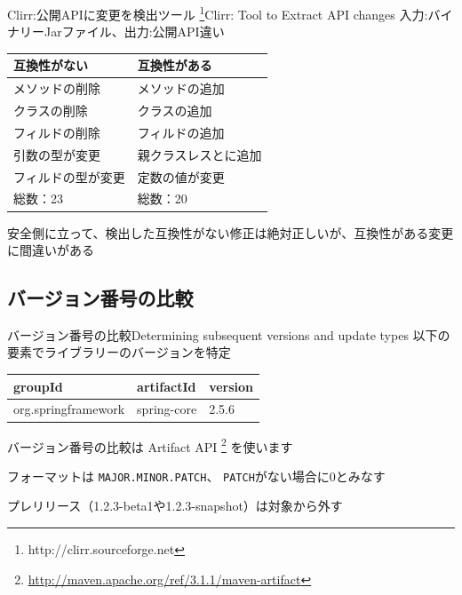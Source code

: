 \begin{frame}{Clirr:公開APIに変更を検出ツール
\footnote{http://clirr.sourceforge.net}}{Clirr: Tool to Extract API changes}
入力:バイナリーJarファイル、出力:公開API違い

\vspace{0.5em}

\begin{tabular}{l|l}
互換性がない & 互換性がある \\
\hline
メソッドの削除 & メソッドの追加 \\
クラスの削除 & クラスの追加 \\
フィルドの削除 & フィルドの追加 \\
引数の型が変更 & 親クラスレスとに追加 \\
フィルドの型が変更 & 定数の値が変更　\\
\hline
総数：23 & 総数：20
\end{tabular}

\vspace{0.5em}

安全側に立って、検出した互換性がない修正は絶対正しいが、互換性がある変更に間違いがある
\end{frame}

\subsection{バージョン番号の比較}
\begin{frame}{バージョン番号の比較}{Determining subsequent versions and update types}
以下の要素でライブラリーのバージョンを特定

\begin{tabular}{l|l|l}
groupId & artifactId & version \\
\hline
org.springframework & spring-core & 2.5.6 \\
\end{tabular}

\pause\vspace{0.5em}

バージョン番号の比較は Artifact API 
\footnote{\url{http://maven.apache.org/ref/3.1.1/maven-artifact}}
を使います


\pause\vspace{0.5em}

フォーマットは \texttt{MAJOR.MINOR.PATCH}、
\texttt{PATCH}がない場合に0とみなす

\pause\vspace{0.5em}

プレリリース（1.2.3-beta1や1.2.3-snapshot）は対象から外す
\end{frame}
